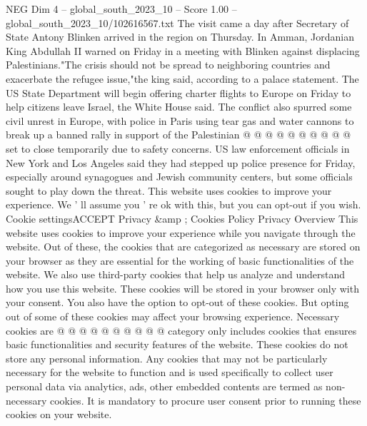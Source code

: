 \begin{textsample}{NEG Dim 4 – global\_south\_2023\_10 – Score 1.00 – global\_south\_2023\_10/102616567.txt}
The visit came a day after Secretary of State Antony Blinken arrived in the region on Thursday.
In Amman, Jordanian King Abdullah II warned on Friday in a meeting with Blinken against displacing Palestinians."The crisis should not be spread to neighboring countries and exacerbate the refugee issue,"the king said, according to a palace statement.
The US State Department will begin offering charter flights to Europe on Friday to help citizens leave Israel, the White House said.
The conflict also spurred some civil unrest in Europe, with police in Paris using tear gas and water cannons to break up a banned rally in support of the Palestinian @ @ @ @ @ @ @ @ @ @ set to close temporarily due to safety concerns.
US law enforcement officials in New York and Los Angeles said they had stepped up police presence for Friday, especially around synagogues and Jewish community centers, but some officials sought to play down the threat.
This website uses cookies to improve your experience.
We ' ll assume you ' re ok with this, but you can opt-out if you wish.
Cookie settingsACCEPT Privacy \&amp ; Cookies Policy Privacy Overview This website uses cookies to improve your experience while you navigate through the website.
Out of these, the cookies that are categorized as necessary are stored on your browser as they are essential for the working of basic functionalities of the website.
We also use third-party cookies that help us analyze and understand how you use this website.
These cookies will be stored in your browser only with your consent.
You also have the option to opt-out of these cookies.
But opting out of some of these cookies may affect your browsing experience.
Necessary cookies are @ @ @ @ @ @ @ @ @ @ category only includes cookies that ensures basic functionalities and security features of the website.
These cookies do not store any personal information.
Any cookies that may not be particularly necessary for the website to function and is used specifically to collect user personal data via analytics, ads, other embedded contents are termed as non-necessary cookies.
It is mandatory to procure user consent prior to running these cookies on your website.

\end{textsample}
